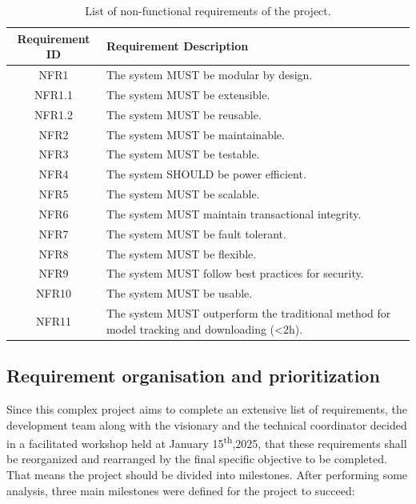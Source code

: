 \begin{table}[H]
	\centering
	\caption{List of non-functional requirements of the project.}
	\label{tab:nonFunctionalRequirements}
	\begin{tabular}{ | c | p{12cm} |}
		\hline
		\textbf{Requirement ID} & \textbf{Requirement Description} \\ \hline
        NFR1    & The system MUST be modular by design. \\ \hline
        NFR1.1  & The system MUST be extensible. \\ \hline
        NFR1.2  & The system MUST be reusable. \\ \hline
        NFR2    & The system MUST be maintainable. \\ \hline
        NFR3    & The system MUST be testable. \\ \hline
        NFR4    & The system SHOULD be power efficient. \\ \hline
        NFR5    & The system MUST be scalable. \\ \hline
        NFR6    & The system MUST maintain transactional integrity. \\ \hline
        NFR7    & The system MUST be fault tolerant. \\ \hline
        NFR8    & The system MUST be flexible. \\ \hline
        NFR9    & The system MUST follow best practices for security. \\ \hline
        NFR10   & The system MUST be usable. \\ \hline
        NFR11   & The system MUST outperform the traditional method for model tracking and downloading (<2h). \\ \hline
	\end{tabular}
\end{table}

\subsection{Requirement organisation and prioritization}\label{sec:requirementOrganisation}

Since this complex project aims to complete an extensive list of requirements, the development team along with the visionary and the technical coordinator decided in a 
facilitated workshop held at January 15\textsuperscript{th},2025, that these requirements shall be reorganized and rearranged by the final specific objective to be
completed. That means the project should be divided into milestones. After performing some analysis, three main milestones were defined for the project to succeed:


